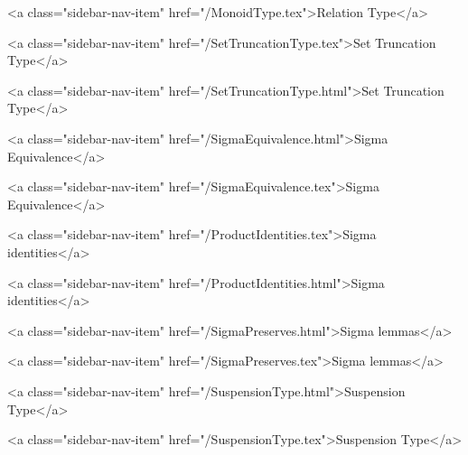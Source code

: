       
    
      
        
          <a class="sidebar-nav-item" href="/MonoidType.tex">Relation Type</a>
        
      
    
      
        
          <a class="sidebar-nav-item" href="/SetTruncationType.tex">Set Truncation Type</a>
        
      
    
      
        
          <a class="sidebar-nav-item" href="/SetTruncationType.html">Set Truncation Type</a>
        
      
    
      
        
          <a class="sidebar-nav-item" href="/SigmaEquivalence.html">Sigma Equivalence</a>
        
      
    
      
        
          <a class="sidebar-nav-item" href="/SigmaEquivalence.tex">Sigma Equivalence</a>
        
      
    
      
        
          <a class="sidebar-nav-item" href="/ProductIdentities.tex">Sigma identities</a>
        
      
    
      
        
          <a class="sidebar-nav-item" href="/ProductIdentities.html">Sigma identities</a>
        
      
    
      
        
          <a class="sidebar-nav-item" href="/SigmaPreserves.html">Sigma lemmas</a>
        
      
    
      
        
          <a class="sidebar-nav-item" href="/SigmaPreserves.tex">Sigma lemmas</a>
        
      
    
      
        
          <a class="sidebar-nav-item" href="/SuspensionType.html">Suspension Type</a>
        
      
    
      
        
          <a class="sidebar-nav-item" href="/SuspensionType.tex">Suspension Type</a>
        
